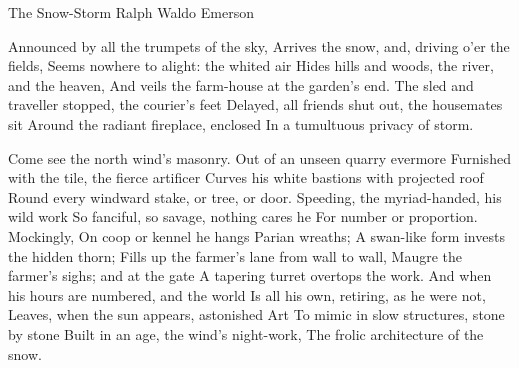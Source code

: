 The Snow-Storm
Ralph Waldo Emerson

Announced by all the trumpets of the sky,
Arrives the snow, and, driving o'er the fields,
Seems nowhere to alight: the whited air
Hides hills and woods, the river, and the heaven,
And veils the farm-house at the garden's end.
The sled and traveller stopped, the courier's feet
Delayed, all friends shut out, the housemates sit
Around the radiant fireplace, enclosed
In a tumultuous privacy of storm.

Come see the north wind's masonry.
Out of an unseen quarry evermore
Furnished with the tile, the fierce artificer
Curves his white bastions with projected roof
Round every windward stake, or tree, or door.
Speeding, the myriad-handed, his wild work
So fanciful, so savage, nothing cares he
For number or proportion. Mockingly,
On coop or kennel he hangs Parian wreaths;
A swan-like form invests the hidden thorn;
Fills up the farmer's lane from wall to wall,
Maugre the farmer's sighs; and at the gate
A tapering turret overtops the work.
And when his hours are numbered, and the world
Is all his own, retiring, as he were not,
Leaves, when the sun appears, astonished Art
To mimic in slow structures, stone by stone
Built in an age, the wind's night-work,
The frolic architecture of the snow.
